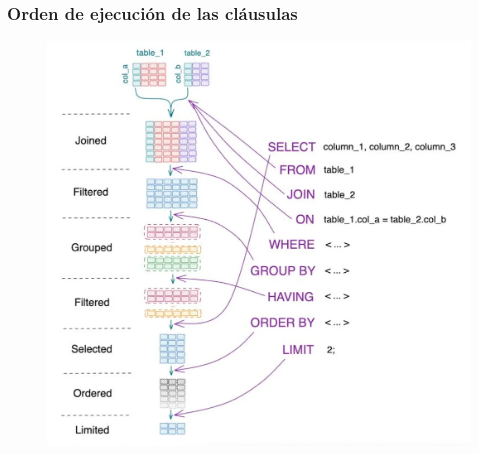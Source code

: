 \documentclass[
	10pt, %
	aspectratio=169, %
]{beamer}
\begin{document}
\begin{frame}

	\frametitle{Orden de ejecución de las cláusulas}
	
	\begin{figure}[h]
		\centering
		\includegraphics[scale=0.2]{orden.jpg}
	\end{figure}

\end{frame}

\end{document}
